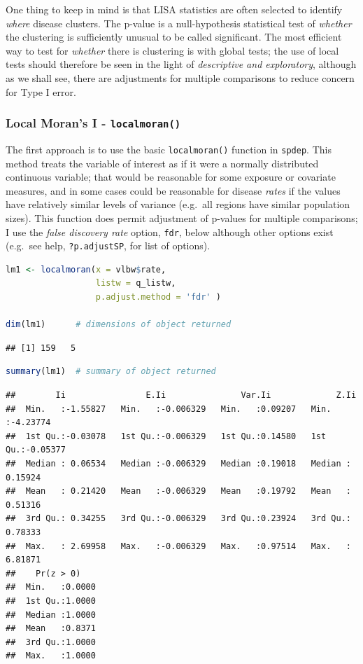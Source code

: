 \documentclass[
]{book}
\newcommand{\passthrough}[1]{#1}
\begin{document}
One thing to keep in mind is that LISA statistics are often selected to identify \emph{where} disease clusters. The p-value is a null-hypothesis statistical test of \emph{whether} the clustering is sufficiently unusual to be called significant. The most efficient way to test for \emph{whether} there is clustering is with global tests; the use of local tests should therefore be seen in the light of \emph{descriptive and exploratory}, although as we shall see, there are adjustments for multiple comparisons to reduce concern for Type I error.

\hypertarget{local-morans-i---localmoran}{%
\subsubsection{\texorpdfstring{Local Moran's I - \texttt{localmoran()}}{Local Moran's I - localmoran()}}\label{local-morans-i---localmoran}}

The first approach is to use the basic \passthrough{\lstinline!localmoran()!} function in \passthrough{\lstinline!spdep!}. This method treats the variable of interest as if it were a normally distributed continuous variable; that would be reasonable for some exposure or covariate measures, and in some cases could be reasonable for disease \emph{rates} if the values have relatively similar levels of variance (e.g.~all regions have similar population sizes). This function does permit adjustment of p-values for multiple comparisons; I use the \emph{false discovery rate} option, \passthrough{\lstinline!fdr!}, below although other options exist (e.g.~see help, \passthrough{\lstinline!?p.adjustSP!}, for list of options).

\begin{lstlisting}[language=R]
lm1 <- localmoran(x = vlbw$rate,
                  listw = q_listw,
                  p.adjust.method = 'fdr' )

dim(lm1)      # dimensions of object returned
\end{lstlisting}

\begin{lstlisting}
## [1] 159   5
\end{lstlisting}

\begin{lstlisting}[language=R]
summary(lm1)  # summary of object returned
\end{lstlisting}

\begin{lstlisting}
##        Ii                E.Ii               Var.Ii             Z.Ii         
##  Min.   :-1.55827   Min.   :-0.006329   Min.   :0.09207   Min.   :-4.23774  
##  1st Qu.:-0.03078   1st Qu.:-0.006329   1st Qu.:0.14580   1st Qu.:-0.05377  
##  Median : 0.06534   Median :-0.006329   Median :0.19018   Median : 0.15924  
##  Mean   : 0.21420   Mean   :-0.006329   Mean   :0.19792   Mean   : 0.51316  
##  3rd Qu.: 0.34255   3rd Qu.:-0.006329   3rd Qu.:0.23924   3rd Qu.: 0.78333  
##  Max.   : 2.69958   Max.   :-0.006329   Max.   :0.97514   Max.   : 6.81871  
##    Pr(z > 0)     
##  Min.   :0.0000  
##  1st Qu.:1.0000  
##  Median :1.0000  
##  Mean   :0.8371  
##  3rd Qu.:1.0000  
##  Max.   :1.0000
\end{lstlisting}
\end{document}
